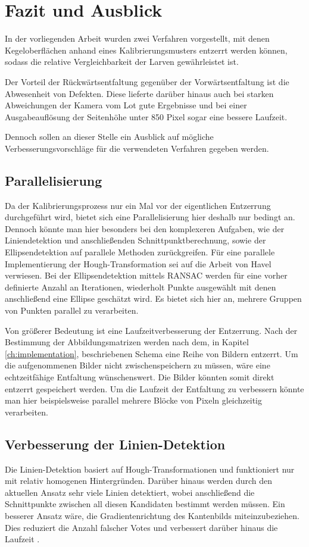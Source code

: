 \chapter{Fazit und Ausblick}
\label{ch:summary}
In der vorliegenden Arbeit wurden zwei Verfahren vorgestellt, mit denen Kegeloberflächen anhand eines Kalibrierungsmusters entzerrt werden können, sodass die relative Vergleichbarkeit der Larven gewährleistet ist.

Der Vorteil der Rückwärtsentfaltung gegenüber der Vorwärtsentfaltung ist die Abwesenheit von Defekten. Diese lieferte darüber hinaus auch bei starken Abweichungen der Kamera vom Lot gute Ergebnisse und bei einer Ausgabeauflösung der Seitenhöhe unter 850 Pixel sogar eine bessere Laufzeit.

Dennoch sollen an dieser Stelle ein Ausblick auf mögliche Verbesserungsvorschläge für die verwendeten Verfahren gegeben werden.

\section{Parallelisierung}
Da der Kalibrierungsprozess nur ein Mal vor der eigentlichen Entzerrung durchgeführt wird, bietet sich eine Parallelisierung hier deshalb nur bedingt an.
Dennoch könnte man hier besonders bei den komplexeren Aufgaben, wie der Liniendetektion und anschließenden Schnittpunktberechnung, sowie der Ellipsendetektion auf parallele Methoden zurückgreifen.
Für eine parallele Implementierung der Hough-Transformation sei auf die Arbeit von Havel \cite{Havel2014} verwiesen.
Bei der Ellipsendetektion mittels RANSAC werden für eine vorher definierte Anzahl an Iterationen, wiederholt Punkte ausgewählt mit denen anschließend eine Ellipse geschätzt wird. Es bietet sich hier an, mehrere Gruppen von Punkten parallel zu verarbeiten.

Von größerer Bedeutung ist eine Laufzeitverbesserung der Entzerrung. Nach der Bestimmung der Abbildungsmatrizen werden nach dem, in Kapitel \ref{ch:implementation}, beschriebenen Schema eine Reihe von Bildern entzerrt. Um die aufgenommenen Bilder nicht zwischenspeichern zu müssen, wäre eine echtzeitfähige Entfaltung wünschenswert. Die Bilder könnten somit direkt entzerrt gespeichert werden.  Um die Laufzeit der Entfaltung zu verbessern könnte man hier beispielsweise parallel mehrere Blöcke von Pixeln gleichzeitig verarbeiten.


\section{Verbesserung der Linien-Detektion}
Die Linien-Detektion basiert auf Hough-Transformationen und funktioniert nur mit relativ homogenen Hintergründen. Darüber hinaus werden durch den aktuellen Ansatz sehr viele Linien detektiert, wobei anschließend die Schnittpunkte zwischen all diesen Kandidaten bestimmt werden müssen. Ein besserer Ansatz wäre, die Gradientenrichtung des Kantenbilds miteinzubeziehen. Dies reduziert die Anzahl falscher Votes und verbessert darüber hinaus die Laufzeit \cite{Gorman1976}.


